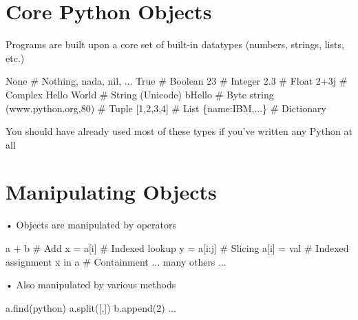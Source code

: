 \documentclass[
  letterpaper,
  DIV=11,
  numbers=noendperiod]{scrreprt}
\newenvironment{Shaded}{\begin{snugshade}}{\end{snugshade}}
\newcommand{\DecValTok}[1]{\textcolor[rgb]{0.68,0.00,0.00}{#1}}
\newcommand{\ErrorTok}[1]{\textcolor[rgb]{0.68,0.00,0.00}{#1}}
\newcommand{\NormalTok}[1]{\textcolor[rgb]{0.00,0.23,0.31}{#1}}
\newcommand{\StringTok}[1]{\textcolor[rgb]{0.13,0.47,0.30}{#1}}
\begin{document}
\chapter{Core Python Objects}\label{core-python-objects}

Programs are built upon a core set of built-in datatypes (numbers,
strings, lists, etc.)

\begin{Shaded}
\begin{Highlighting}[]
\NormalTok{None \# Nothing, nada, nil, ...  }
\NormalTok{True \# Boolean  }
\NormalTok{23 \# Integer  }
\NormalTok{2.3 \# Float  }
\NormalTok{2+3j \# Complex  }
\NormalTok{\textquotesingle{}Hello World\textquotesingle{} \# String (Unicode)  }
\NormalTok{b\textquotesingle{}Hello\textquotesingle{} \# Byte string  }
\NormalTok{(\textquotesingle{}www.python.org\textquotesingle{},80) \# Tuple  }
\NormalTok{[1,2,3,4] \# List  }
\NormalTok{\{\textquotesingle{}name\textquotesingle{}:\textquotesingle{}IBM\textquotesingle{},...\} \# Dictionary }
\end{Highlighting}
\end{Shaded}

You should have already used most of these types if you've written any
Python at all


\chapter{Manipulating Objects}\label{manipulating-objects}

• Objects are manipulated by operators

\begin{Shaded}
\begin{Highlighting}[]
\NormalTok{a + b \# Add  }
\NormalTok{x = a[i] \# Indexed lookup  }
\NormalTok{y = a[i:j] \# Slicing  }
\NormalTok{a[i] = val \# Indexed assignment  }
\NormalTok{x in a \# Containment  }
\NormalTok{... many others ... }
\end{Highlighting}
\end{Shaded}

• Also manipulated by various methods

\begin{Shaded}
\begin{Highlighting}[]
\NormalTok{a.find(}\StringTok{\textquotesingle{}python\textquotesingle{}}\NormalTok{)  }
\NormalTok{a.split([}\StringTok{\textquotesingle{}\textquotesingle{}}\NormalTok{,}\StringTok{\textquotesingle{}])  }
\ErrorTok{b.append}\NormalTok{(}\DecValTok{2}\NormalTok{)  }
\NormalTok{...}
\end{Highlighting}
\end{Shaded}
\end{document}
